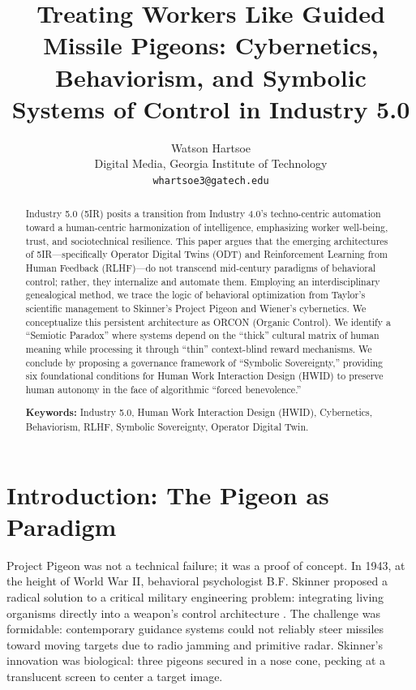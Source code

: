 \documentclass[11pt, a4paper]{article}
\title{\textbf{Treating Workers Like Guided Missile Pigeons: Cybernetics, Behaviorism, and Symbolic Systems of Control in Industry 5.0}}
\author{Watson Hartsoe \\ 
\normalsize Digital Media, Georgia Institute of Technology \\ 
\normalsize \texttt{whartsoe3@gatech.edu}}
\date{}
\begin{document}
\maketitle

\begin{abstract}
Industry 5.0 (5IR) posits a transition from Industry 4.0's techno-centric automation toward a human-centric harmonization of intelligence, emphasizing worker well-being, trust, and sociotechnical resilience. This paper argues that the emerging architectures of 5IR—specifically Operator Digital Twins (ODT) and Reinforcement Learning from Human Feedback (RLHF)—do not transcend mid-century paradigms of behavioral control; rather, they internalize and automate them. Employing an interdisciplinary genealogical method, we trace the logic of behavioral optimization from Taylor’s scientific management to Skinner’s Project Pigeon and Wiener’s cybernetics. We conceptualize this persistent architecture as ORCON (Organic Control). We identify a ``Semiotic Paradox'' where systems depend on the ``thick'' cultural matrix of human meaning while processing it through ``thin'' context-blind reward mechanisms. We conclude by proposing a governance framework of ``Symbolic Sovereignty,'' providing six foundational conditions for Human Work Interaction Design (HWID) to preserve human autonomy in the face of algorithmic ``forced benevolence.''

\vspace{0.5em}
\noindent \textbf{Keywords:} Industry 5.0, Human Work Interaction Design (HWID), Cybernetics, Behaviorism, RLHF, Symbolic Sovereignty, Operator Digital Twin.
\end{abstract}


\section{Introduction: The Pigeon as Paradigm}

Project Pigeon was not a technical failure; it was a proof of concept. In 1943, at the height of World War II, behavioral psychologist B.F. Skinner proposed a radical solution to a critical military engineering problem: integrating living organisms directly into a weapon's control architecture \cite{skinner1960pigeons}. The challenge was formidable: contemporary guidance systems could not reliably steer missiles toward moving targets due to radio jamming and primitive radar. Skinner's innovation was biological: three pigeons secured in a nose cone, pecking at a translucent screen to center a target image.
\end{document}
